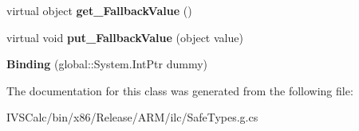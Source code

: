 \begin{DoxyCompactItemize}
virtual object {\bfseries get\+\_\+\+Fallback\+Value} ()
\item 
\mbox{\label{class_windows_1_1_u_i_1_1_xaml_1_1_data_1_1_binding_ac1d4f41e87949cd4ffad38415709db6c}} 
virtual void {\bfseries put\+\_\+\+Fallback\+Value} (object value)
\item 
\mbox{\label{class_windows_1_1_u_i_1_1_xaml_1_1_data_1_1_binding_ae314033417c6ca80ae3826ead1750150}} 
{\bfseries Binding} (global\+::\+System.\+Int\+Ptr dummy)
\end{DoxyCompactItemize}


The documentation for this class was generated from the following file\+:\begin{DoxyCompactItemize}
\item 
I\+V\+S\+Calc/bin/x86/\+Release/\+A\+R\+M/ilc/Safe\+Types.\+g.\+cs\end{DoxyCompactItemize}
